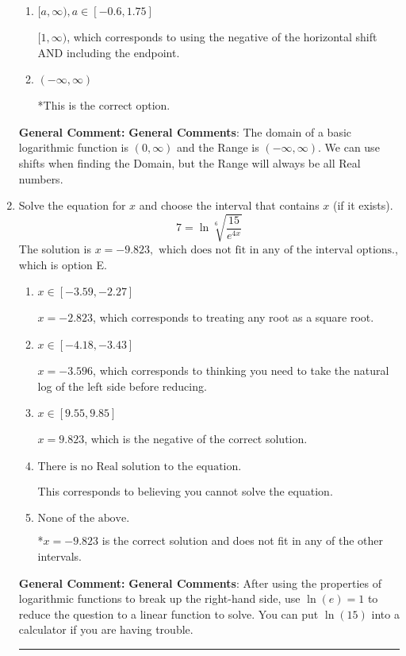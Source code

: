 \documentclass{extbook}[14pt]
\newcommand{\litem}[1]{\item #1

\rule{\textwidth}{0.4pt}}
\begin{document}
\begin{enumerate}
{\begin{enumerate}[label=\Alph*.]
$(-\infty, 3)$, which corresponds to using the vertical shift while the Range is $(-\infty, \infty)$.
\item \( [a, \infty), a \in [-0.6, 1.75] \)

$[1, \infty)$, which corresponds to using the negative of the horizontal shift AND including the endpoint.
\item \( (-\infty, \infty) \)

*This is the correct option.
\end{enumerate}

\textbf{General Comment:} \textbf{General Comments}: The domain of a basic logarithmic function is $(0, \infty)$ and the Range is $(-\infty, \infty)$. We can use shifts when finding the Domain, but the Range will always be all Real numbers.
}
\litem{
 Solve the equation for $x$ and choose the interval that contains $x$ (if it exists).
\[  7 = \ln{\sqrt[6]{\frac{15}{e^{4x}}}} \]The solution is \( x = -9.823, \text{ which does not fit in any of the interval options.} \), which is option E.\begin{enumerate}[label=\Alph*.]
\item \( x \in [-3.59, -2.27] \)

$x = -2.823$, which corresponds to treating any root as a square root.
\item \( x \in [-4.18, -3.43] \)

$x = -3.596$, which corresponds to thinking you need to take the natural log of the left side before reducing.
\item \( x \in [9.55, 9.85] \)

$x = 9.823$, which is the negative of the correct solution.
\item \( \text{There is no Real solution to the equation.} \)

This corresponds to believing you cannot solve the equation.
\item \( \text{None of the above.} \)

*$x = -9.823$ is the correct solution and does not fit in any of the other intervals.
\end{enumerate}

\textbf{General Comment:} \textbf{General Comments}: After using the properties of logarithmic functions to break up the right-hand side, use $\ln(e) = 1$ to reduce the question to a linear function to solve. You can put $\ln(15)$ into a calculator if you are having trouble.
}
\end{enumerate}
\end{document}
